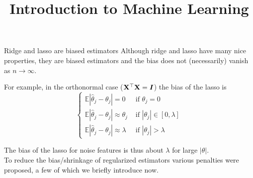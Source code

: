 \documentclass[11pt,compress,t,notes=noshow, xcolor=table]{beamer}
\title{Introduction to Machine Learning}
\begin{document}

\begin{vbframe}{Ridge and lasso are biased estimators} 
Although ridge and lasso have many nice properties, they are biased estimators and the bias does not (necessarily) vanish as $n \rightarrow \infty$.\\
\vspace{0.3cm}

For example, in the orthonormal case ($\mathbf{X}^{\top}\mathbf{X}=\bm{I}$) the bias of the lasso is
$$
\begin{cases}\mathbb{E}\left|\widehat{\theta}_j-\theta_j\right|=0 & \text { if } \theta_j=0 \\ \mathbb{E}\left|\widehat{\theta}_j-\theta_j\right| \approx \theta_j & \text { if }\left|\theta_j\right| \in[0, \lambda] \\ \mathbb{E}\left|\widehat{\theta}_j-\theta_j\right| \approx \lambda & \text { if }\left|\theta_j\right|>\lambda\end{cases}
$$
\vspace{0.3cm}

The bias of the lasso for noise features is thus about $\lambda$ for large $|\theta|$.\\
\vspace{0.2cm}
To reduce the bias/shrinkage of regularized estimators various penalties were proposed, a few of which we briefly introduce now.

\end{vbframe}
\end{document}
